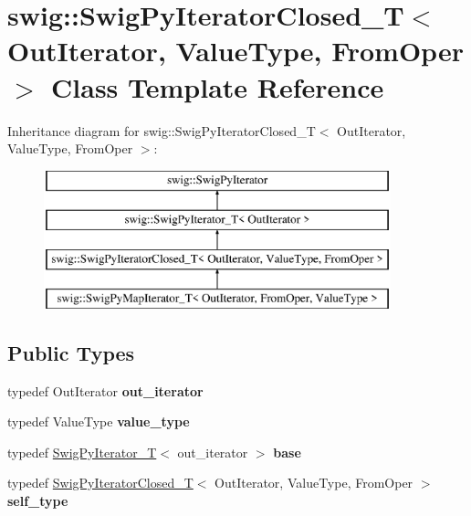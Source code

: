 \hypertarget{classswig_1_1_swig_py_iterator_closed___t}{}\section{swig\+:\+:Swig\+Py\+Iterator\+Closed\+\_\+T$<$ Out\+Iterator, Value\+Type, From\+Oper $>$ Class Template Reference}
\label{classswig_1_1_swig_py_iterator_closed___t}
Inheritance diagram for swig\+:\+:Swig\+Py\+Iterator\+Closed\+\_\+T$<$ Out\+Iterator, Value\+Type, From\+Oper $>$\+:\begin{figure}[H]
\begin{center}
\leavevmode
\includegraphics[height=4.000000cm]{classswig_1_1_swig_py_iterator_closed___t}
\end{center}
\end{figure}
\subsection*{Public Types}
\begin{DoxyCompactItemize}
\item 
\mbox{\label{classswig_1_1_swig_py_iterator_closed___t_ad1905c1ed0b2c2cb975788b82df5dba7}} 
typedef Out\+Iterator {\bfseries out\+\_\+iterator}
\item 
\mbox{\label{classswig_1_1_swig_py_iterator_closed___t_adff468d976862d52fa259857d5a30dba}} 
typedef Value\+Type {\bfseries value\+\_\+type}
\item 
\mbox{\label{classswig_1_1_swig_py_iterator_closed___t_a7a4e72c91ddb0aa9a92484d20c260ee8}} 
typedef \hyperlink{classswig_1_1_swig_py_iterator___t}{Swig\+Py\+Iterator\+\_\+T}$<$ out\+\_\+iterator $>$ {\bfseries base}
\item 
\mbox{\label{classswig_1_1_swig_py_iterator_closed___t_a37a58d5b5c7a26f9345246d781e7edd4}} 
typedef \hyperlink{classswig_1_1_swig_py_iterator_closed___t}{Swig\+Py\+Iterator\+Closed\+\_\+T}$<$ Out\+Iterator, Value\+Type, From\+Oper $>$ {\bfseries self\+\_\+type}
\end{DoxyCompactItemize}
